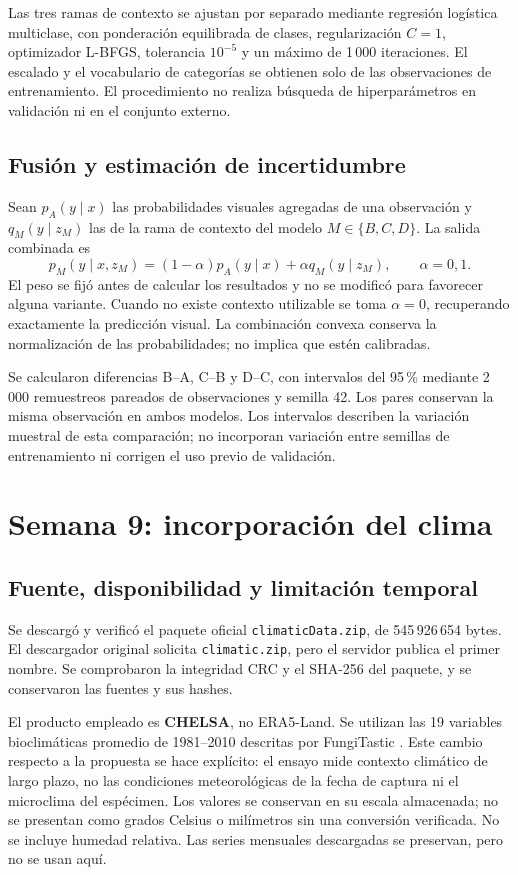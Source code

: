 \documentclass[11pt,a4paper]{article}
\begin{document}
Las tres ramas de contexto se ajustan por separado mediante regresión
logística multiclase, con ponderación equilibrada de clases, regularización
\(C=1\), optimizador L-BFGS, tolerancia \(10^{-5}\) y un máximo de 1\,000
iteraciones. El escalado y el vocabulario de categorías se obtienen solo de
las observaciones de entrenamiento. El procedimiento no realiza búsqueda de
hiperparámetros en validación ni en el conjunto externo.

\subsection{Fusión y estimación de incertidumbre}
Sean \(p_A(y\mid x)\) las probabilidades visuales agregadas de una observación
y \(q_M(y\mid z_M)\) las de la rama de contexto del modelo
\(M\in\{B,C,D\}\). La salida combinada es
\begin{equation}
 p_M(y\mid x,z_M)=(1-\alpha)p_A(y\mid x)+\alpha q_M(y\mid z_M),
 \qquad \alpha=0,1.
\end{equation}
El peso se fijó antes de calcular los resultados y no se modificó para
favorecer alguna variante. Cuando no existe contexto utilizable se toma
\(\alpha=0\), recuperando exactamente la predicción visual. La combinación
convexa conserva la normalización de las probabilidades; no implica que
estén calibradas.

Se calcularon diferencias B--A, C--B y D--C, con intervalos del 95\,\% mediante
2\,000 remuestreos pareados de observaciones y semilla 42. Los pares conservan
la misma observación en ambos modelos. Los intervalos describen la variación
muestral de esta comparación; no incorporan variación entre semillas de
entrenamiento ni corrigen el uso previo de validación.

\section{Semana 9: incorporación del clima}
\subsection{Fuente, disponibilidad y limitación temporal}
Se descargó y verificó el paquete oficial \texttt{climaticData.zip}, de
545\,926\,654 bytes. El descargador original solicita \texttt{climatic.zip},
pero el servidor publica el primer nombre. Se comprobaron la integridad CRC y
el SHA-256 del paquete, y se conservaron las fuentes y sus hashes.

El producto empleado es \textbf{CHELSA}, no ERA5-Land. Se utilizan las 19
variables bioclimáticas promedio de 1981--2010 descritas por FungiTastic
\cite{fungitastic}. Este cambio respecto a la propuesta se hace explícito:
el ensayo mide contexto climático de largo plazo, no las condiciones
meteorológicas de la fecha de captura ni el microclima del espécimen.
Los valores se conservan en su escala almacenada; no se presentan como grados
Celsius o milímetros sin una conversión verificada. No se incluye humedad
relativa. Las series mensuales descargadas se preservan, pero no se usan aquí.
\end{document}
